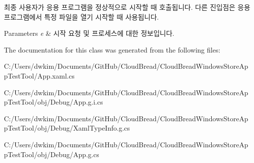 최종 사용자가 응용 프로그램을 정상적으로 시작할 때 호출됩니다. 다른 진입점은 응용 프로그램에서 특정 파일을 열기 시작할 때 사용됩니다. 


\begin{DoxyParams}{Parameters}
{\em e} & 시작 요청 및 프로세스에 대한 정보입니다.\\
\hline
\end{DoxyParams}


The documentation for this class was generated from the following files\+:\begin{DoxyCompactItemize}
\item 
C\+:/\+Users/dwkim/\+Documents/\+Git\+Hub/\+Cloud\+Bread/\+Cloud\+Bread\+Windows\+Store\+App\+Test\+Tool/App.\+xaml.\+cs\item 
C\+:/\+Users/dwkim/\+Documents/\+Git\+Hub/\+Cloud\+Bread/\+Cloud\+Bread\+Windows\+Store\+App\+Test\+Tool/obj/\+Debug/App.\+g.\+i.\+cs\item 
C\+:/\+Users/dwkim/\+Documents/\+Git\+Hub/\+Cloud\+Bread/\+Cloud\+Bread\+Windows\+Store\+App\+Test\+Tool/obj/\+Debug/Xaml\+Type\+Info.\+g.\+cs\item 
C\+:/\+Users/dwkim/\+Documents/\+Git\+Hub/\+Cloud\+Bread/\+Cloud\+Bread\+Windows\+Store\+App\+Test\+Tool/obj/\+Debug/App.\+g.\+cs\end{DoxyCompactItemize}
